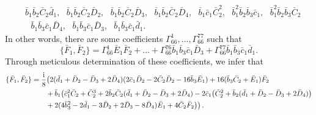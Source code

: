 \documentclass[10pt]{amsart}
\theoremstyle{definition}
\theoremstyle{corollary}
\theoremstyle{remark}
\theoremstyle{conclusion}
\begin{document}
\begin{align*}
    &\, \bar{b}_1 \bar{b}_2 \bar{C}_2 \bar{d}_1, \text{ }\bar{b}_1 \bar{b}_2 \bar{C}_2 \bar{D}_2, \text{ }\bar{b}_1 \bar{b}_2 \bar{C}_2 \bar{D}_3, \text{ }\bar{b}_1 \bar{b}_2 \bar{C}_2 \bar{D}_4, \text{ }\bar{b}_1 \bar{c}_1 \bar{C}_2^2, \text{ }\bar{b}_1^2 \bar{b}_2 \bar{b}_3 \bar{c}_1, \text{ }\bar{b}_1^2 \bar{b}_2 \bar{b}_3 \bar{C}_2 \\
    & \, \text{ }\bar{b}_1 \bar{b}_3 \bar{c}_1 \bar{D}_4,\text{ }\bar{b}_1 \bar{b}_3 \bar{c}_1 \bar{D}_3,\text{ }\bar{b}_1 \bar{b}_3 \bar{c}_1 \bar{d}_1 .
 \end{align*} In other words, there are some coefficients $\Gamma_{66}^1,\ldots,\Gamma_{66}^{77}$ such that $$\{\bar{F}_1,\bar{F}_2\} =  \Gamma_{66}^1 \bar{E}_1 \bar{F}_2 + \ldots +  \Gamma_{66}^{76}  \bar{b}_1 \bar{b}_3 \bar{c}_1 \bar{D}_3 + \Gamma_{66}^{77}  \bar{b}_1 \bar{b}_3 \bar{c}_1 \bar{d}_1 .$$  Through meticulous determination of these coefficients, we infer that \begin{align*}
     \{\bar{F}_1, \bar{F}_2\}&=\frac{{\rm i}}{8}\bigl( 2(\bar{d}_1+\bar{D}_2-\bar{D}_3+2\bar{D}_4)(2\bar{c}_1\bar{D}_2-2\bar{C}_2\bar{D}_2-16 \bar{b}_3\bar{E}_1)+16(\bar{b}_3\bar{C}_2+\bar{E}_1)\bar{F}_2 \nonumber \\
& \hskip 0.7 cm +\bar{b}_1 \bigl(\bar{c}_1^2\bar{C}_2+\bar{C}_2^3+2\bar{b}_2\bar{C}_2(\bar{d}_1+\bar{D}_2-\bar{D}_3+2\bar{D}_4)-2 \bar{c}_1\bigl(\bar{C}_2^2+\bar{b}_2(\bar{d}_1+\bar{D}_2-\bar{D}_3+2\bar{D}_4)\bigl) \nonumber\\
& \hskip 0.7 cm +2 (4 \bar{b}_3^2-2\bar{d}_1-3\bar{D}_2+2\bar{D}_3-8\bar{D}_4)\bar{E}_1+4 \bar{C}_2 \bar{F}_2\bigl) \bigl) \, .
 \end{align*} 
 
\end{document}
